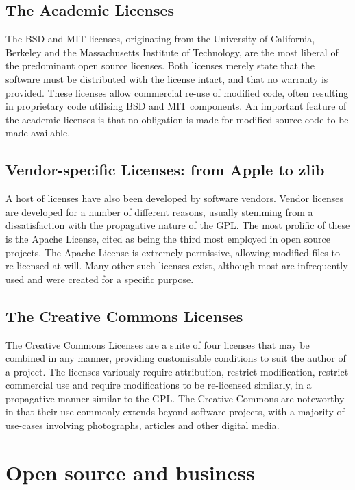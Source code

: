 \documentclass[a4paper]{article}
\begin{document}
\subsection{The Academic Licenses}

The BSD\cite{bsd} and MIT\cite{mit} licenses, originating from the University of California, Berkeley and the Massachusetts Institute of Technology, are the most liberal of the predominant open source licenses. Both licenses merely state that the software must be distributed with the license intact, and that no warranty is provided. These licenses allow commercial re-use of modified code, often resulting in proprietary code utilising BSD and MIT components. An important feature of the academic licenses is that no obligation is made for modified source code to be made available.

\subsection{Vendor-specific Licenses: from Apple to zlib}

A host of licenses have also been developed by software vendors. Vendor licenses are developed for a number of different reasons, usually stemming from a dissatisfaction with the propagative nature of the GPL. The most prolific of these is the Apache License\cite{apache}, cited as being the third most employed in open source projects\cite{oslicenseusage}. The Apache License is extremely permissive, allowing modified files to re-licensed at will. Many other such licenses exist, although most are infrequently used and were created for a specific purpose.

\subsection{The Creative Commons Licenses}

The Creative Commons Licenses\cite{cc} are a suite of four licenses that may be combined in any manner, providing customisable conditions to suit the author of a project. The licenses variously require attribution, restrict modification, restrict commercial use and require modifications to be re-licensed similarly, in a propagative manner similar to the GPL. The Creative Commons are noteworthy in that their use commonly extends beyond software projects, with a majority of use-cases involving photographs, articles and other digital media\cite{ccdir}.

\section{Open source and business}
\end{document}
